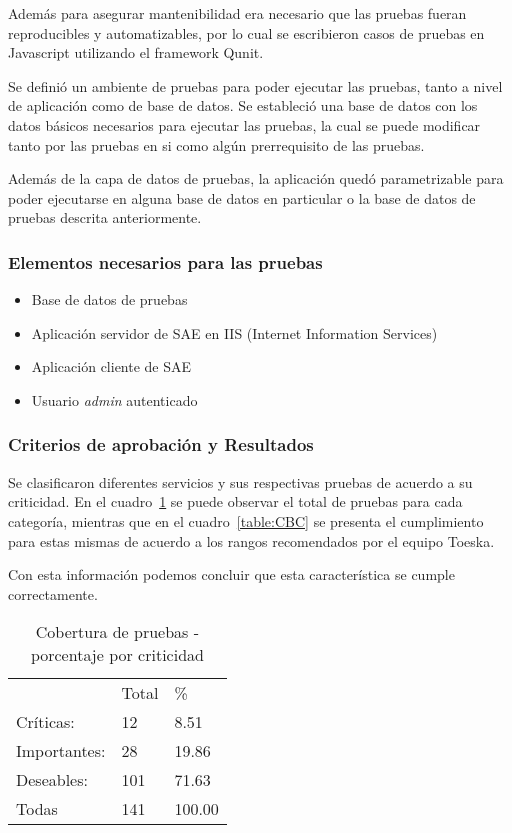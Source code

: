 Además para asegurar mantenibilidad era necesario que las pruebas fueran 
reproducibles y automatizables, por lo cual se escribieron casos de pruebas en 
Javascript utilizando el framework Qunit.

Se definió un ambiente de pruebas para poder ejecutar las pruebas, tanto a 
nivel de aplicación como de base de datos. Se estableció una base de datos con 
los datos básicos necesarios para ejecutar las pruebas, la cual se puede 
modificar tanto por las pruebas en si como algún prerrequisito de las pruebas.

Además de la capa de datos de pruebas, la aplicación quedó parametrizable para 
poder ejecutarse en alguna base de datos en particular o la base de datos de 
pruebas descrita anteriormente.


\subsubsection{Elementos necesarios para las pruebas}

\begin{itemize}
\item Base de datos de pruebas
\item Aplicación servidor de SAE en IIS (Internet Information Services)
\item Aplicación cliente de SAE
\item Usuario \textit{admin} autenticado
\end{itemize}



\subsubsection{Criterios de aprobación y Resultados}
Se clasificaron diferentes servicios y sus respectivas pruebas de acuerdo a su criticidad.
En el cuadro~\ref{table:CBPC} se puede observar el total de pruebas para cada 
categoría, mientras que en el cuadro~\ref{table:CBC} se presenta el cumplimiento 
para estas mismas de acuerdo a los rangos recomendados por el equipo Toeska.

Con esta información podemos concluir que esta característica se cumple correctamente.
\begin{table}[hb]
\centering
    \begin{tabular}{lll}
    ~               & Total  & \%        \\
     		Críticas:    &  		12  &  		8.51   \\
     		Importantes: &  		28  &  		19.86  \\
     		Deseables:   &  		101 &  		71.63  \\
     		Todas        &  		141 &  		100.00 \\ \hline
    \end{tabular}
     \caption{Cobertura de pruebas - porcentaje por criticidad}
    \label{table:CBPC}
\end{table}

